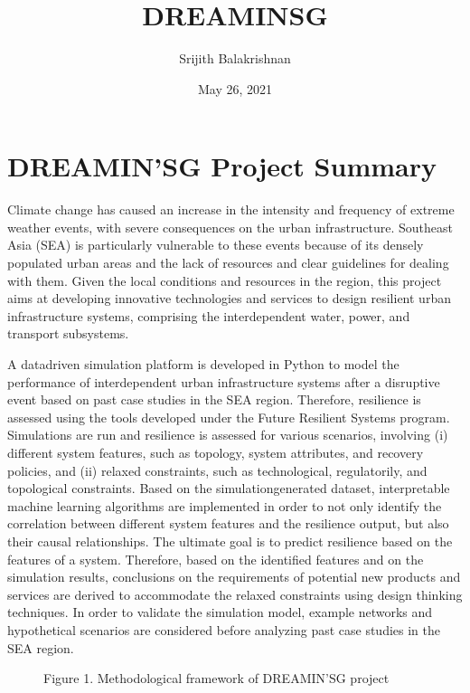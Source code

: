 \documentclass[letterpaper,10pt,english]{sphinxmanual}
\title{DREAMIN\textquotesingle{}SG}
\date{May 26, 2021}
\author{Srijith Balakrishnan}
\begin{document}
\pagestyle{empty}
\sphinxmaketitle
\pagestyle{plain}
\sphinxtableofcontents
\pagestyle{normal}
\label{\detokenize{index::doc}}



\chapter{DREAMIN’SG Project Summary}
\label{\detokenize{index:dreamin-sg-project-summary}}
\sphinxAtStartPar
Climate change has caused an increase in the intensity and frequency of extreme weather events,
with severe consequences on the urban infrastructure. Southeast Asia (SEA) is particularly vulnerable
to these events because of its densely populated urban areas and the lack of resources and clear
guidelines for dealing with them. Given the local conditions and resources in the region, this
project aims at developing innovative technologies and services to design resilient urban infrastructure
systems, comprising the interdependent water, power, and transport subsystems.

\sphinxAtStartPar
A data\sphinxhyphen{}driven simulation platform is developed in Python to model the performance of interdependent
urban infrastructure systems after a disruptive event based on past case studies in the SEA region.
Therefore, resilience is assessed using the tools developed under the Future Resilient Systems program.
Simulations are run and resilience is assessed for various scenarios, involving (i) different system
features, such as topology, system attributes, and recovery policies, and (ii) relaxed constraints,
such as technological, regulatorily, and topological constraints. Based on the simulation\sphinxhyphen{}generated
dataset, interpretable machine learning algorithms are implemented in order to not only identify the
correlation between different system features and the resilience output, but also their causal
relationships. The ultimate goal is to predict resilience based on the features of a system. Therefore,
based on the identified features and on the simulation results, conclusions on the requirements of
potential new products and services are derived to accommodate the relaxed constraints using design
thinking techniques. In order to validate the simulation model, example networks and hypothetical
scenarios are considered before analyzing past case studies in the SEA region.

\begin{figure}[htbp]
\centering
\capstart

\noindent{}
\caption{Figure 1. Methodological framework of DREAMIN’SG project}\label{\detokenize{index:id1}}\end{figure}
\end{document}
